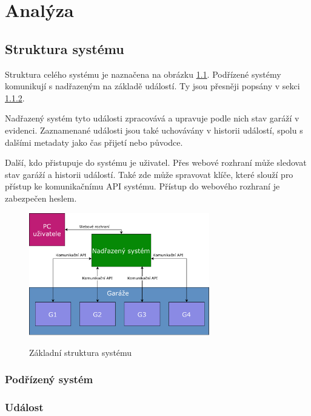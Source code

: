 \chapter{Analýza}

\section{Struktura systému}

Struktura celého systému je naznačena na obrázku \ref{fig:basic_struct}. Podřízené systémy komunikují s nadřazeným na základě událostí. Ty jsou přesněji popsány v sekci \ref{sec:event}.

Nadřazený systém tyto události zpracovává a upravuje podle nich stav garáží v evidenci. Zaznamenané události jsou také uchovávány v historii událostí, spolu s dalšími metadaty jako čas přijetí nebo původce.

Další, kdo přistupuje do systému je uživatel. Přes webové rozhraní může sledovat stav garáží a historii událostí. Také zde může spravovat klíče, které slouží pro přístup ke komunikačnímu API systému. Přístup do webového rozhraní je zabezpečen heslem. 

\begin{figure}[h!]
    \centering
    \includegraphics[width=0.7\textwidth]{images/basic_struct.pdf}
    \label{fig:basic_struct}
    \caption[Konečná podoba zařízení]{Základní struktura systému}
\end{figure}

\subsection{Podřízený systém}

\subsection{Událost}
\label{sec:event}

